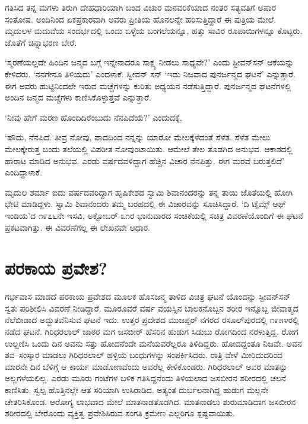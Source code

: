 ಗತಿಸಿದ ತನ್ನ ಮಗಳು ತಿರುಗಿ ದೇಹಧಾರಿಯಾಗಿ ಬಂದ ವಿಚಾರ ಮನವರಿಕೆಯಾದ ನಂತರ ಸತ್ಯವತಿಗೆ ಅಪಾರ ಸಂತೋಷ. ಅಂದಿನಿಂದ ಏಕಪ್ರಕಾರವಾಗಿ ಅವರು ಪ್ರೀತಿಯ ಹೊನಲನ್ನೇ ಹರಿಸುತ್ತಿದ್ದಾರೆ ಈ ಪುತ್ರಿಯ ಮೇಲೆ. ಮೃದುಲಳ ಮದುವೆಯ ಸಂದರ್ಭದಲ್ಲಿ ಒಂದು ಒಳ್ಳೆಯ ಬಂಗಲೆಯನ್ನೂ, ಹತ್ತು ಸಾವಿರ ರೂಪಾಯಿಗಳನ್ನೂ ಕೊಟ್ಟರು. ಜೊತೆಗೆ ಚಿನ್ನಾಭರಣ ಬೇರೆ.

‘ಸ್ಮರಣೆಯಲ್ಲದೇ ಹಿಂದಿನ ಜನ್ಮದ ಬಗ್ಗೆ ಇನ್ನೇನಾದರೂ ಸಾಕ್ಷ್ಯ ನೀಡಲು ಸಾಧ್ಯವೇ?’ ಎಂದು ಸ್ಟೀವನ್​ಸನ್ ಆಕೆಯನ್ನು ಕೇಳಿದರು. ‘ನನಗೇನೂ ತಿಳಿಯದು’ ಎಂದಳಾಕೆ. ಸ್ವೀವನ್ ಸನ್ ‘ಇದು ನಿಜವಾದ ಪುನರ್ಜನ್ಮದ ಘಟನೆ’ ಎನ್ನುತ್ತಾರೆ. ಈಗ ಅವರು ಹುಟ್ಟಿನಿಂದಲೇ ಇರುವ ಮಚ್ಚೆಗಳನ್ನು ಕುರಿತು ಅಧ್ಯಯನ ನಡೆಸುತ್ತಿದ್ದಾರೆ. ಪುನರ್ಜನ್ಮದ ಘಟನೆಗಳಲ್ಲಿ ಅಂದಿನ ಜನ್ಮದ ಮಚ್ಚೆಗಳು ಕಾಣಿಸಿಕೊಳ್ಳುತ್ತವೆ ಎನ್ನುತ್ತಾರೆ.

‘ನೀವು ಹೇಗೆ ಮರಣ ಹೊಂದಿದಿರೆಂಬುದು ನೆನಪಿದೆಯೆ?’ ಎಂದುದಕ್ಕೆ,

‘ಹೌದು, ನೆನಪಿದೆ. ತೀವ್ರ ನೋವು, ಪಾದದಿಂದ ನನ್ನನ್ನು ಯಾರೋ ಮೇಲಕ್ಕೆಳೆದಂತೆ ಸೆಳೆತ. ಸೆಳೆತ ಮೇಲು ಮೇಲಕ್ಕೇರುತ್ತ ಬಂದು ತಲೆಯಲ್ಲಿ ವಿಪರೀತ ನೋವುಂಟಾಯಿತು. ಆಮೇಲೆ ತೇಲ ತೊಡಗಿದ ಅನುಭವ. ಆಕಾಶದಲ್ಲಿ ಹಾರಾಟ ಮಾಡಿದ ಅನುಭವ. ಎರಡು ವರ್ಷದವಳಿದ್ದಾಗ ಹೆಚ್ಚಿನ ವಿಚಾರ ನೆನಪಿತ್ತು. ಈಗ ಮರವೆ ಬರುತ್ತಲಿದೆ’ ಎಂದಿದ್ದಾಳಾಕೆ.

ಮೃದುಲ ಶರ್ಮಾ ಐದು ವರ್ಷದವರಿದ್ದಾಗ ಹೃಷಿಕೇಶದ ಸ್ವಾಮಿ ಶಿವಾನಂದರನ್ನು ತನ್ನ ತಾಯಿ ಜೊತೆಯಲ್ಲಿ ಹೋಗಿ ಭೇಟಿ ಮಾಡಿದ್ದಳು. ಸ್ವಾಮಿ ಶಿವಾನಂದರು ತಮ್ಮ ಬರಹದಲ್ಲಿ ಈ ವಿಚಾರವನ್ನು ಸೂಚಿಸಿದ್ದಾರೆ. ‘ದಿ ಟೈಮ್ಸ್ ಆಫ್ ಇಂಡಿಯ’ದ ೧೯೭೬ನೇ ಇಸವಿ, ಅಕ್ಟೋಬರ್ ೩೧ರ ಭಾನುವಾರದ ಸಂಚಿಕೆಯಲ್ಲಿ ಸಚಿತ್ರ ವಿವರಣೆಯೊಂದಿಗೆ ಈ ಘಟನೆ ಪ್ರಕಟವಾಗಿತ್ತು. ಈ ವಿವರಣೆಗೆಲ್ಲ ಈ ಲೇಖನವೇ ಆಧಾರ.


\section*{ಪರಕಾಯ ಪ್ರವೇಶ?}


ಗರ್ಭವಾಸ ಮಾಡದೆ ಪರಕಾಯ ಪ್ರವೇಶದ ಮೂಲಕ ಹೊಸಜನ್ಮ ತಾಳಿದ ವಿಚಿತ್ರ ಘಟನೆ ಯೊಂದನ್ನು ಸ್ಟೀವನ್​ಸನ್ ಸ್ವತಃ ಪರಿಶೀಲಿಸಿ ವಿವರಣೆ ನೀಡಿದ್ದಾರೆ. ಮೂರೂವರೆ ವರ್ಷ ವಯಸ್ಸಿನ ಬಾಲಕನೊಬ್ಬನ ಶರೀರ ಇನ್ನೊಬ್ಬ ಜೀವಾತ್ಮದ ನೆಲೆಬೀಡಾದ ಅದ್ಭುತವೆನಿಸುವ ಘಟನೆ ಇದು. ಉತ್ತರ ಪ್ರದೇಶದ ಮುಜಪ್ಫರ್ ನಗರದ ರಸೂಲ್​ಪುರದಲ್ಲಿ ೧೯೫೪ರಲ್ಲಿ ನಡೆದ ಘಟನೆ. ಗಿರಿಧರಲಾಲ್ ಜಾಠರ ಮಗ ಜಸಬೀರ್ ಹೆಸರಿನ ಹುಡುಗ ಸಿಡುಬು ರೋಗದಿಂದ ನರಳುತ್ತಿದ್ದ. ರೋಗ ಉಲ್ಬಣಿಸಿ ಒಂದು ದಿನ ಅವನು ಸತ್ತು ಹೋದನೆಂದೇ ಮನೆಯವರೆಲ್ಲರೂ ತಿಳಿದಿದ್ದರು. ಹೋದದ್ದಂತೂ ನಿಜವೇ. ಅವನ ಶವ–ಸಂಸ್ಕಾರ ಮಾಡಲು ಗಿರಿಧರಲಾಲ್ ಹಳ್ಳಿಯ ಬಂಧುಗಳನ್ನು ಸಂಪರ್ಕಿಸಿದರು. ರಾತ್ರಿ ವೇಳೆ ಮೀರಿದುದರಿಂದ ಮಾರನೇ ದಿನ ಬೆಳಿಗ್ಗೆ ಆ ಕಾರ್ಯ ಮಾಡೋಣವೆಂದು ಅವರೆಲ್ಲ ಕೇಳಿಕೊಂಡರು. ಗಿರಿಧರಲಾಲ್ ಅವರ ಮಾತನ್ನು ಅಲ್ಲಗಳೆಯಲಿಲ್ಲ. ಎರಡು ಮೂರು ಗಂಟೆಗಳ ಬಳಿಕ ಗತಿಸಿದ್ದನೆಂದು ತಿಳಿಯಲಾದ ಜಸಬೀರನ ಶರೀರದಲ್ಲಿ ಚಲನೆ ಕಾಣಿಸಿತು. ಸ್ವಲ್ಪ ಹೊತ್ತಿನಲ್ಲೇ ಆತ ಸರಿಯಾಗಿ ಉಸಿರಾಡಿದ. ಅತ್ಯಂತ ದುರ್ಬಲನಾಗಿದ್ದ ಹುಡುಗ ಮೆಲ್ಲನೇ ಚೇತರಿಸಿಕೊಂಡ. ಆರೋಗ್ಯ ಲಾಭವಾದ ಮೇಲೆ ಮಾತನಾಡತೊಡಗಿದ. ಮಾತನಾಡಲು ಶುರುಮಾಡಿದಾಗ ಜಸಬೀರನ ಶರೀರದಲ್ಲಿ ಬೇರೊಂದು ವ್ಯಕ್ತಿತ್ವ ಪ್ರವೇಶಿಸಿರುವ ಸಂಗತಿ ಕ್ರಮೇಣ ಎಲ್ಲರಿಗೂ ಸ್ಪಷ್ಟವಾಯಿತು.

